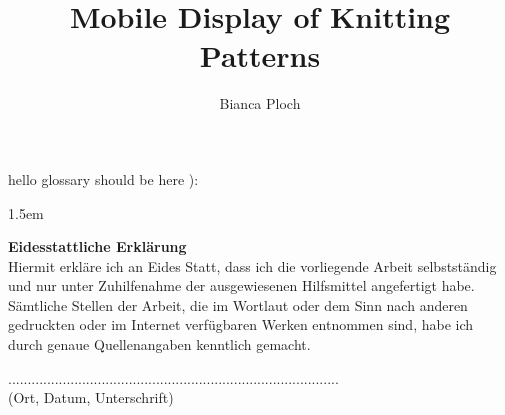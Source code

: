 \author{Bianca Ploch}
\title{Mobile Display of Knitting Patterns}




\makeglossaries




% 






\newpage
hello glossary should be here ):
\printglossary[type=\acronymtype,title={Abbreviations}]

\newpage 
\sloppy %
\emergencystretch 1.5em %
\listoffigures

\newpage
\lstlistoflistings

\printbibliography


\begin{appendix}
   \clearpage
   
\end{appendix}

\newpage
\thispagestyle{empty}

\noindent \textbf{Eidesstattliche Erklärung}\\

\noindent Hiermit erkläre ich an Eides Statt, dass ich die vorliegende Arbeit selbstständig und nur unter
Zuhilfenahme der ausgewiesenen Hilfsmittel angefertigt habe.
Sämtliche Stellen der Arbeit, die im Wortlaut oder dem Sinn nach anderen gedruckten oder
im Internet verfügbaren Werken entnommen sind, habe ich durch genaue Quellenangaben
kenntlich gemacht.

\vspace*{1.5cm}
\noindent .....................................................................................\\
(Ort, Datum, Unterschrift)

